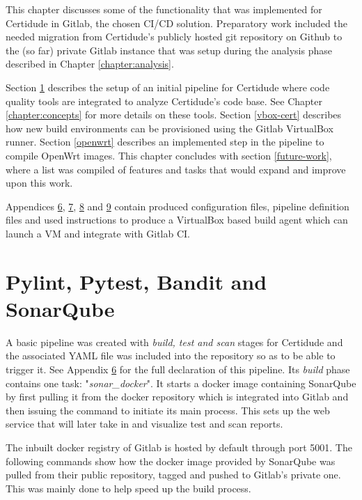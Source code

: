 This chapter discusses some of the functionality that was implemented for Certidude in Gitlab, the chosen CI/CD solution. Preparatory work included the needed migration from Certidude's publicly hosted git repository on Github to the (so far) private Gitlab instance that was setup during the analysis phase described in Chapter \ref{chapter:analysis}. 

Section \ref{sec:pylint-pytest-bandit-sonarqube} describes the setup of an initial pipeline for Certidude where code quality tools are integrated to analyze Certidude's code base. See Chapter \ref{chapter:concepts} for more details on these tools. Section \ref{vbox-cert} describes how new build environments can be provisioned using the Gitlab VirtualBox runner. Section \ref{openwrt} describes an implemented step in the pipeline to compile OpenWrt images. This chapter concludes with section \ref{future-work}, where a list was compiled of features and tasks that would expand and improve upon this work.

Appendices \hyperref[chapter:appendix-certidude-pipeline]{6}, \hyperref[chapter:appendix-sonar]{7}, \hyperref[chapter:appendix-vbox]{8} and \hyperref[chapter:appendix-openwrt]{9} contain produced configuration files, pipeline definition files and used instructions to produce a VirtualBox based build agent which can launch a VM and integrate with Gitlab CI.

\section{Pylint, Pytest, Bandit and SonarQube} \label{sec:pylint-pytest-bandit-sonarqube}
A basic pipeline was created with \textit{build, test and scan} stages for Certidude and the associated YAML file was included into the repository so as to be able to trigger it. See Appendix \hyperref[chapter:appendix-certidude-pipeline]{6} for the full declaration of this pipeline. Its \textit{build} phase contains one task: "\textit{sonar\_docker}". It starts a docker image containing SonarQube by first pulling it from the docker repository which is integrated into Gitlab and then issuing the command to initiate its main process. This sets up the web service that will later take in and visualize test and scan reports. 

The inbuilt docker registry of Gitlab is hosted by default through port 5001. The following commands show how the docker image provided by SonarQube was pulled from their public repository, tagged and pushed to Gitlab's private one. This was mainly done to help speed up the build process.

